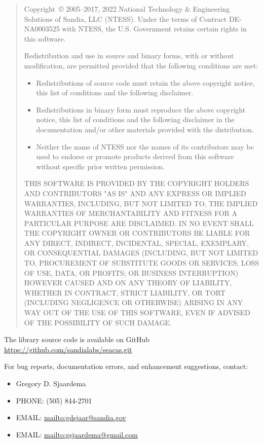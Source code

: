 \begin{quote}
Copyright~\copyright{} 2005--2017, 2022 National Technology \& Engineering Solutions
of Sandia, LLC (NTESS).  Under the terms of Contract DE-NA0003525 with
NTESS, the U.S. Government retains certain rights in this software.

Redistribution and use in source and binary forms, with or without
modification, are permitted provided that the following conditions are
met:

\begin{itemize}
\item Redistributions of source code must retain the above copyright
      notice, this list of conditions and the following disclaimer.

\item Redistributions in binary form must reproduce the above
      copyright notice, this list of conditions and the following
      disclaimer in the documentation and/or other materials provided
      with the distribution.

\item Neither the name of NTESS nor the names of its
      contributors may be used to endorse or promote products derived
      from this software without specific prior written permission.
\end{itemize}

THIS SOFTWARE IS PROVIDED BY THE COPYRIGHT HOLDERS AND CONTRIBUTORS
"AS IS" AND ANY EXPRESS OR IMPLIED WARRANTIES, INCLUDING, BUT NOT
LIMITED TO, THE IMPLIED WARRANTIES OF MERCHANTABILITY AND FITNESS FOR
A PARTICULAR PURPOSE ARE DISCLAIMED. IN NO EVENT SHALL THE COPYRIGHT
OWNER OR CONTRIBUTORS BE LIABLE FOR ANY DIRECT, INDIRECT, INCIDENTAL,
SPECIAL, EXEMPLARY, OR CONSEQUENTIAL DAMAGES (INCLUDING, BUT NOT
LIMITED TO, PROCUREMENT OF SUBSTITUTE GOODS OR SERVICES; LOSS OF USE,
DATA, OR PROFITS; OR BUSINESS INTERRUPTION) HOWEVER CAUSED AND ON ANY
THEORY OF LIABILITY, WHETHER IN CONTRACT, STRICT LIABILITY, OR TORT
(INCLUDING NEGLIGENCE OR OTHERWISE) ARISING IN ANY WAY OUT OF THE USE
OF THIS SOFTWARE, EVEN IF ADVISED OF THE POSSIBILITY OF SUCH DAMAGE.
\end{quote}

The \exo{} library source code is available on GitHub
\url{https://github.com/sandialabs/seacas.git}

For bug reports, documentation errors, and enhancement suggestions,
contact:
\begin{itemize}
   \item Gregory D. Sjaardema
   \item PHONE: (505) 844-2701
   \item EMAIL: \url{mailto:gdsjaar@sandia.gov}
   \item EMAIL: \url{mailto:gsjaardema@gmail.com}
\end{itemize}
